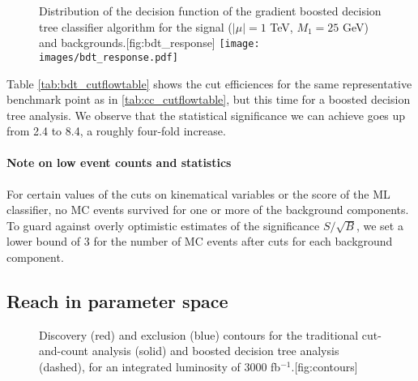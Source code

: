 \begin{figure}
\begin{sidecaption}{Distribution of the decision function of the gradient boosted decision tree classifier algorithm for the signal ($|\mu| = 1$ TeV, $M_1 = 25$ GeV) and backgrounds.}[fig:bdt_response]
\centering
\texttt{[image: images/bdt\_response.pdf]}
\end{sidecaption}
\end{figure}

\begin{table}
  \begin{adjustwidth}{-1in}{0in}
  \centering
  
  \caption{Representative cut flow table for the same benchmark point and integrated luminosity as in \autoref{tab:cc_cutflowtable}, but using a boosted decision tree (BDT) analysis instead. The preselection is equivalent to the trigger and identification cuts listed in \autoref{tab:cc_cutflowtable}. As before, all the cross sections are in femtobarns.}
\label{tab:bdt_cutflowtable}
\end{adjustwidth}
\end{table}

Table \ref{tab:bdt_cutflowtable} shows the cut efficiences for the same representative benchmark point as in \autoref{tab:cc_cutflowtable}, but this time for a boosted decision tree analysis. We observe that the statistical significance we can achieve goes up from 2.4 to 8.4, a roughly four-fold increase.

\paragraph{Note on low event counts and statistics} For certain values of the cuts on kinematical variables or the score of the ML classifier, no MC events survived for one or more of the background components. To guard against overly optimistic estimates of the significance $S/\sqrt{B}$, we set a lower bound of 3 for the number of MC events after cuts for each background component.

\subsection{Reach in parameter space}
\begin{figure}
\strictpagecheck
  \begin{sidecaption}{Discovery (red) and exclusion (blue) contours for the traditional cut-and-count analysis (solid) and boosted decision tree analysis (dashed), for an integrated luminosity of 3000 fb$^{-1}$.}[fig:contours]
\centering

\end{sidecaption}

\end{figure}

